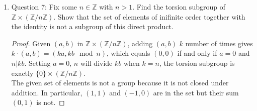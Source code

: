 \documentclass{article}
\begin{document}
\begin{enumerate}
\begin{enumerate}
\begin{proof}
          Consider the group $G=GL_2(\mathbb{R})$, and the following
          elements in $G$:
          \begin{align*}
            A =
            \begin{pmatrix}
              0 & -1 \\
              1 & 0 \\
            \end{pmatrix},\; &&
            B =
            \begin{pmatrix}
              0   & 1 \\
              -1  & -0 \\
            \end{pmatrix}. \\
          \end{align*}
          Then $A^4=B^3=I$, so $A$ and $B$ are in the torsion set of $G$.
          However, we can show by induction on $n$ that 
          \begin{align*}
            (AB)^n =
            \begin{pmatrix}
              0   & n \\
              0   & 1 \\
            \end{pmatrix}, \\
          \end{align*}
          implying that $AB$ is not in the torsion set, which means the
          torsion set is not closed under multiplication and thus cannot be
          a group.
        \end{proof}

      \item Question 7: Fix some $n\in\mathbb{Z}$ with $n>1$. Find the
        torsion subgroup of $\mathbb{Z}\times(\mathbb{Z}/n\mathbb{Z})$.
        Show that the set of elements of inifinite order together with the
        identity is not a subgroup of this direct product.

        \begin{proof}
          Given $(a,b)$ in $\mathbb{Z}\times(\mathbb{Z}/n\mathbb{Z})$,
          adding $(a,b)$ $k$ number of times gives $k\cdot(a,b)=(ka,kb\mod
          n)$, which equals $(0,0)$ if and only if $a=0$ and $n|kb$.
          Setting $a=0$, $n$ will divide $kb$ when $k=n$, the torsion
          subgroup is exactly $\{0\}\times(\mathbb{Z}/n\mathbb{Z})$. \\

          The given set of elements is not a group because it is not closed
          under addition. In particular, $(1,1)$ and $(-1,0)$ are in the set
          but their sum $(0,1)$ is not.
        \end{proof}


\end{enumerate}
\end{enumerate}
\end{document}
